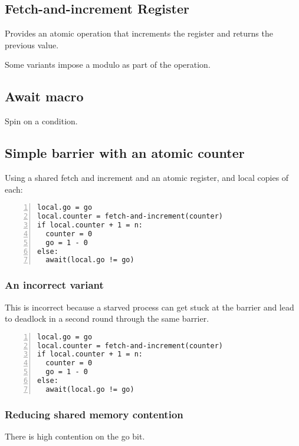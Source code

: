 \documentclass{idc_msc}
\begin{document}
\subsection{Fetch-and-increment Register}

Provides an atomic operation that increments the register and returns the previous value.

Some variants impose a modulo as part of the operation.

\subsection{Await macro}

Spin on a condition.

\subsection{Simple barrier with an atomic counter}

Using a shared fetch and increment and an atomic register, and local copies of each:

\begin{lstlisting}[frame=L,mathescape=true,numbers=left,title={For process i in 0...n}]
local.go = go
local.counter = fetch-and-increment(counter)
if local.counter + 1 = n:
  counter = 0
  go = 1 - 0
else:
  await(local.go != go)
\end{lstlisting}

\subsubsection{An incorrect variant}

This is incorrect because a starved process can get stuck at the barrier and lead to deadlock in a second round through the same barrier.

\begin{lstlisting}[frame=L,mathescape=true,numbers=left,title={For process i in 0...n}]
local.go = go
local.counter = fetch-and-increment(counter)
if local.counter + 1 = n:
  counter = 0
  go = 1 - 0
else:
  await(local.go != go)
\end{lstlisting}

\subsubsection{Reducing shared memory contention}

There is high contention on the go bit.
\end{document}
